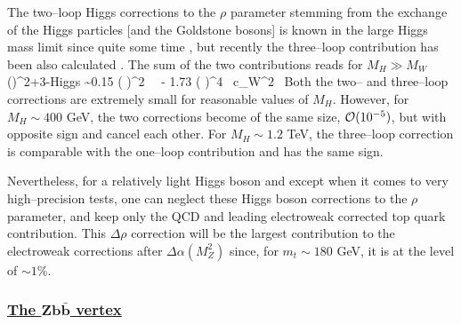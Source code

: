 The two--loop Higgs corrections to the $\rho$ parameter stemming from the
exchange of the Higgs particles [and the Goldstone bosons] is known in the
large Higgs mass limit since quite some time \cite{rho-Higgs2loop}, but
recently the three--loop contribution has been also calculated \cite{Jochum}.
The sum of the two contributions reads for $M_H \gg M_W$
\beq
(\Delta \rho)^{\rm 2+3-Higgs} \sim  0.15  \left(  \right)^2 \,  \, 
- 1.73 \left(  \right)^4 \, 
{c_W^2} \, 
\eeq
Both the two-- and three--loop corrections are extremely small for reasonable
values of $M_H$. However, for $M_H \sim 400$ GeV, the two corrections become of
the same size, ${\cal O} (10^{-5})$, but with opposite sign and cancel each
other. For $M_H \sim 1.2$ TeV, the three--loop correction is comparable with
the one--loop contribution and has the same sign. \s 

Nevertheless, for a relatively light Higgs boson and except when it comes to
very high--precision tests, one can neglect these Higgs boson corrections to
the $\rho$ parameter, and keep only the QCD and leading electroweak corrected
top quark contribution.  This $\Delta \rho$ correction will be the largest
contribution to the electroweak corrections after $\Delta \alpha (M_Z^2)$ since,
for $m_t \sim 180$ GeV, it is at the level of $\sim 1$\%.  

\subsubsection*{\underline{The $\mathbf{Zb\bar b}$ vertex}}

